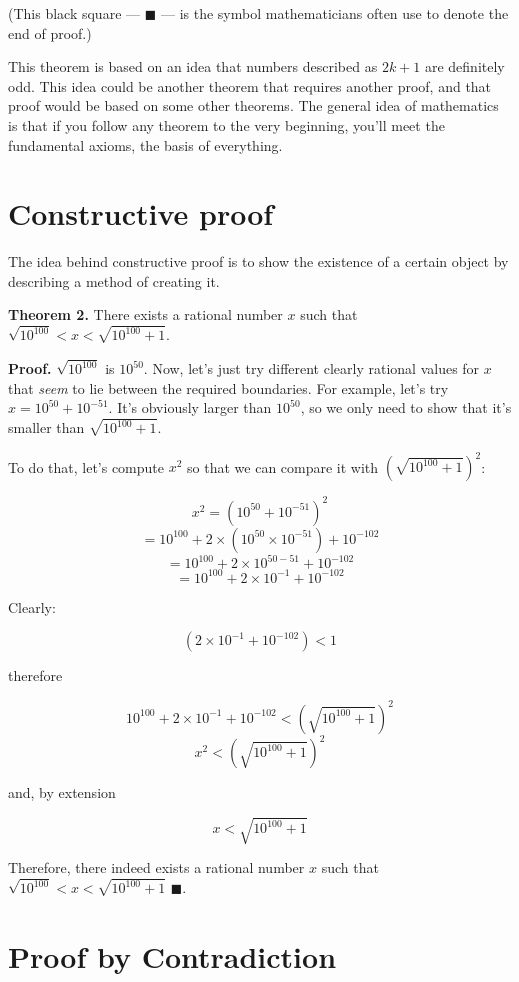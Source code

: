 \documentclass[a4paper, justified, notitlepage, sfsidenotes, notoc]{tufte-book}
\begin{document}
(This black square — \(\blacksquare\) — is the symbol mathematicians often use to denote the end of proof.)

This theorem is based on an idea that numbers described as \(2k + 1\) are definitely odd. This idea could be another theorem that requires another proof, and that proof would be based on some other theorems. The general idea of mathematics is that if you follow any theorem to the very beginning, you'll meet the fundamental axioms, the basis of everything.

\section{Constructive proof}
\label{sec:org573604e}

The idea behind constructive proof is to show the existence of a certain object by describing a method of creating it.

\textbf{Theorem 2.} There exists a rational number \(x\) such that \(\sqrt{10^{100}} < x < \sqrt{10^{100}+1}\).

\textbf{Proof.} \(\sqrt{10^{100}}\) is \(10^{50}\). Now, let's just try different clearly rational values for \(x\) that \emph{seem} to lie between the required boundaries. For example, let's try \(x = 10^{50} + 10^{-51}\). It's obviously larger than \(10^{50}\), so we only need to show that it's smaller than \(\sqrt{10^{100}+1}\).

To do that, let's compute \(x^{2}\) so that we can compare it with \((\sqrt{10^{100}+1})^{2}\):

$$ x^{2} = (10^{50} + 10^{-51})^{2} $$
$$ = 10^{100} + 2 \times (10^{50} \times 10^{-51}) + 10^{-102} $$
$$ = 10^{100} + 2 \times 10^{50-51} + 10^{-102} $$
$$ = 10^{100} + 2 \times 10^{-1} + 10^{-102} $$

Clearly:

$$ (2 \times 10^{-1} + 10^{-102}) < 1 $$

therefore

$$ 10^{100} + 2 \times 10^{-1} + 10^{-102} < (\sqrt{10^{100}+1})^{2} $$
$$ x^{2} < (\sqrt{10^{100}+1})^{2} $$

and, by extension

$$ x < \sqrt{10^{100}+1} $$

Therefore, there indeed exists a rational number \(x\) such that \(\sqrt{10^{100}} < x < \sqrt{10^{100}+1}\) \(\blacksquare\).

\section{Proof by Contradiction}
\label{sec:org43b908d}
\end{document}
